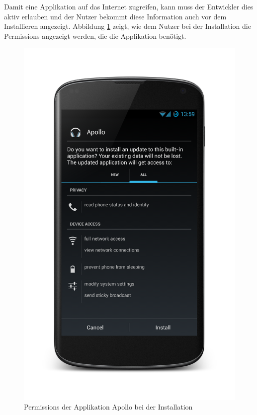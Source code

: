 Damit eine Applikation auf das Internet zugreifen, kann muss der Entwickler dies aktiv erlauben und der Nutzer bekommt diese Information auch vor dem Installieren angezeigt. Abbildung \ref{permissions} zeigt, wie dem Nutzer bei der Installation die Permissions angezeigt werden, die die Applikation benötigt. 

\begin{figure}[ht!]
\begin{center}
\includegraphics[scale=0.2]{images/permissions}
\caption{Permissions der Applikation Apollo bei der Installation}
\label{permissions}
\end{center}
\end{figure}

